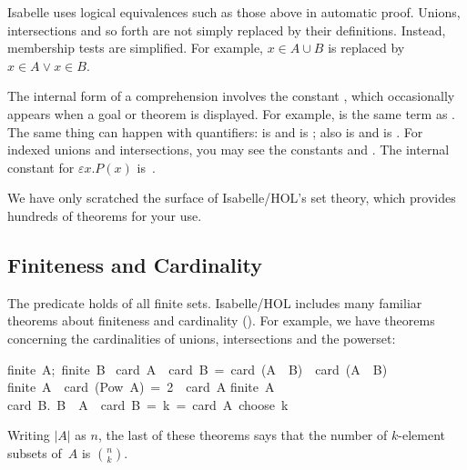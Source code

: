 Isabelle uses logical equivalences such as those above in automatic proof. 
Unions, intersections and so forth are not simply replaced by their
definitions.  Instead, membership tests are simplified.  For example,  $x\in
A\cup B$ is replaced by $x\in A\lor x\in B$.

The internal form of a comprehension involves the constant  
,
which occasionally appears when a goal or theorem
is displayed.  For example,   is the same term as
.  The same thing can
happen with quantifiers:   \hbox{}
is 
 and 
\hbox{} is ; 
also  is 
 and 
 is 
.  For indexed unions and
intersections, you may see the constants 
 and  \@.
The internal constant for $\varepsilon x.P(x)$ is~.

We have only scratched the surface of Isabelle/HOL's set theory, which provides
hundreds of theorems for your use.


\subsection{Finiteness and Cardinality}

%
The predicate  holds of all finite sets.  Isabelle/HOL
includes many familiar theorems about finiteness and cardinality 
(). For example, we have theorems concerning the
cardinalities of unions, intersections and the
powerset:
%
\begin{isabelle}
{\isasymlbrakk}finite\ A;\ finite\ B\isasymrbrakk\isanewline
\isasymLongrightarrow\ card\ A\ \isacharplus\ card\ B\ =\ card\ (A\ \isasymunion\ B)\ \isacharplus\ card\ (A\ \isasyminter\ B)
%
\isanewline
\isanewline
finite\ A\ \isasymLongrightarrow\ card\
(Pow\ A)\  =\ 2\ \isacharcircum\ card\ A%
%
\isanewline
\isanewline
finite\ A\ \isasymLongrightarrow\isanewline
card\ \isacharbraceleft B.\ B\ \isasymsubseteq\
A\ \isasymand\ card\ B\ =\
k\isacharbraceright\ =\ card\ A\ choose\ k%
\rulename{n_subsets}
\end{isabelle}
Writing $|A|$ as $n$, the last of these theorems says that the number of
$k$-element subsets of~$A$ is 
$\binom{n}{k}$.

